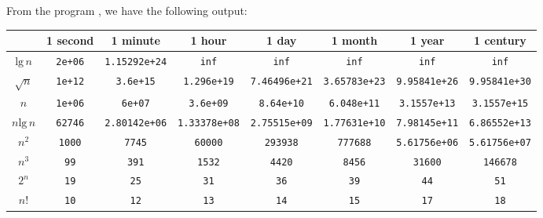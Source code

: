 From the program , we have the following
output:\par
\noindent \begin{tabular}{ c | c | c | c | c | c | c | c |}
    & 1 second & 1 minute & 1 hour & 1 day & 1 month & 1 year & 1 century \\
    \hline
    $\text{lg}\,n$  & \verb|2e+06|  & \verb|1.15292e+24| & \verb|inf|
    & \verb|inf|         & \verb|inf|         & \verb|inf|         & \verb|inf| \\
    \hline
    $\sqrt{n}$      & \verb|1e+12|  & \verb|3.6e+15|     & \verb|1.296e+19|
    & \verb|7.46496e+21| & \verb|3.65783e+23| & \verb|9.95841e+26| & \verb|9.95841e+30| \\
    \hline
    $n$             & \verb|1e+06|  & \verb|6e+07|       & \verb|3.6e+09|
    & \verb|8.64e+10|    & \verb|6.048e+11|   & \verb|3.1557e+13|  & \verb|3.1557e+15| \\
    \hline
    $n\text{lg}\,n$ & \verb|62746|  & \verb|2.80142e+06| & \verb|1.33378e+08|
    & \verb|2.75515e+09| & \verb|1.77631e+10| & \verb|7.98145e+11| & \verb|6.86552e+13| \\
    \hline
    $n^2$           & \verb|1000|   & \verb|7745|        & \verb|60000|
    & \verb|293938|      & \verb|777688|      & \verb|5.61756e+06| & \verb|5.61756e+07| \\
    \hline
    $n^3$           & \verb|99|     & \verb|391|         & \verb|1532|
    & \verb|4420|        & \verb|8456|        & \verb|31600|       & \verb|146678| \\
    \hline
    $2^n$           & \verb|19|     & \verb|25|          & \verb|31|
    & \verb|36|          & \verb|39|          & \verb|44|          & \verb|51| \\
    \hline
    $n!$            & \verb|10|     & \verb|12|          & \verb|13|
    & \verb|14|          & \verb|15|          & \verb|17|          & \verb|18|
    \hline
\end{tabular}
